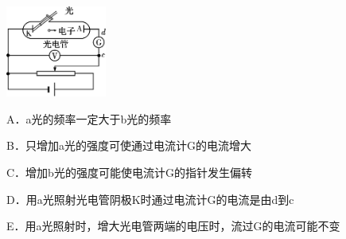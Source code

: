 \begin{center}\includegraphics[width=1.30208in,height=1.17917in]{media/image468.png}\end{center}

A．a光的频率一定大于b光的频率

B．只增加a光的强度可使通过电流计G的电流增大

C．增加b光的强度可能使电流计G的指针发生偏转

D．用a光照射光电管阴极K时通过电流计G的电流是由d到c

E．用a光照射时，增大光电管两端的电压时，流过G的电流可能不变
\newpage
